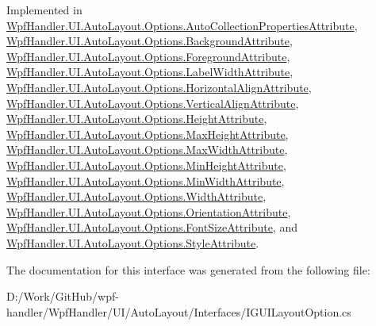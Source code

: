 Implemented in \mbox{\hyperlink{class_wpf_handler_1_1_u_i_1_1_auto_layout_1_1_options_1_1_auto_collection_properties_attribute_aaff2195c793c7e75ac553291d9189655}{Wpf\+Handler.\+U\+I.\+Auto\+Layout.\+Options.\+Auto\+Collection\+Properties\+Attribute}}, \mbox{\hyperlink{class_wpf_handler_1_1_u_i_1_1_auto_layout_1_1_options_1_1_background_attribute_a97cce29c9e19d9145e881c69e3bf3d4e}{Wpf\+Handler.\+U\+I.\+Auto\+Layout.\+Options.\+Background\+Attribute}}, \mbox{\hyperlink{class_wpf_handler_1_1_u_i_1_1_auto_layout_1_1_options_1_1_foreground_attribute_a5231ed2afb4d2d26eac9eab670adca45}{Wpf\+Handler.\+U\+I.\+Auto\+Layout.\+Options.\+Foreground\+Attribute}}, \mbox{\hyperlink{class_wpf_handler_1_1_u_i_1_1_auto_layout_1_1_options_1_1_label_width_attribute_ab8dae5f847875d310747599429c5054a}{Wpf\+Handler.\+U\+I.\+Auto\+Layout.\+Options.\+Label\+Width\+Attribute}}, \mbox{\hyperlink{class_wpf_handler_1_1_u_i_1_1_auto_layout_1_1_options_1_1_horizontal_align_attribute_a53335e3d47b8509f6ce67ad93044a760}{Wpf\+Handler.\+U\+I.\+Auto\+Layout.\+Options.\+Horizontal\+Align\+Attribute}}, \mbox{\hyperlink{class_wpf_handler_1_1_u_i_1_1_auto_layout_1_1_options_1_1_vertical_align_attribute_a5a37e0bcf32b49da94e4f4d539fe810c}{Wpf\+Handler.\+U\+I.\+Auto\+Layout.\+Options.\+Vertical\+Align\+Attribute}}, \mbox{\hyperlink{class_wpf_handler_1_1_u_i_1_1_auto_layout_1_1_options_1_1_height_attribute_a221d69c339ceb5cd3e16d8e59f216cc9}{Wpf\+Handler.\+U\+I.\+Auto\+Layout.\+Options.\+Height\+Attribute}}, \mbox{\hyperlink{class_wpf_handler_1_1_u_i_1_1_auto_layout_1_1_options_1_1_max_height_attribute_a1b1d850c2c5d8e59454d7f9b5271ee88}{Wpf\+Handler.\+U\+I.\+Auto\+Layout.\+Options.\+Max\+Height\+Attribute}}, \mbox{\hyperlink{class_wpf_handler_1_1_u_i_1_1_auto_layout_1_1_options_1_1_max_width_attribute_ab7c7bf52114b1aa465f70debaeccf5f4}{Wpf\+Handler.\+U\+I.\+Auto\+Layout.\+Options.\+Max\+Width\+Attribute}}, \mbox{\hyperlink{class_wpf_handler_1_1_u_i_1_1_auto_layout_1_1_options_1_1_min_height_attribute_a8c049220211484fea64fbd1589a4cc57}{Wpf\+Handler.\+U\+I.\+Auto\+Layout.\+Options.\+Min\+Height\+Attribute}}, \mbox{\hyperlink{class_wpf_handler_1_1_u_i_1_1_auto_layout_1_1_options_1_1_min_width_attribute_a22bf72913c8d5d9f958d1edb1b52beda}{Wpf\+Handler.\+U\+I.\+Auto\+Layout.\+Options.\+Min\+Width\+Attribute}}, \mbox{\hyperlink{class_wpf_handler_1_1_u_i_1_1_auto_layout_1_1_options_1_1_width_attribute_afdff5891e40ae82fc6282d78753ff644}{Wpf\+Handler.\+U\+I.\+Auto\+Layout.\+Options.\+Width\+Attribute}}, \mbox{\hyperlink{class_wpf_handler_1_1_u_i_1_1_auto_layout_1_1_options_1_1_orientation_attribute_affc825395d69d510dfc17e37d330dfc8}{Wpf\+Handler.\+U\+I.\+Auto\+Layout.\+Options.\+Orientation\+Attribute}}, \mbox{\hyperlink{class_wpf_handler_1_1_u_i_1_1_auto_layout_1_1_options_1_1_font_size_attribute_abd93e70e5419e81c4dfdd9b5d1f35343}{Wpf\+Handler.\+U\+I.\+Auto\+Layout.\+Options.\+Font\+Size\+Attribute}}, and \mbox{\hyperlink{class_wpf_handler_1_1_u_i_1_1_auto_layout_1_1_options_1_1_style_attribute_a4507ba7b9729b527b0c4f57bffaac0be}{Wpf\+Handler.\+U\+I.\+Auto\+Layout.\+Options.\+Style\+Attribute}}.



The documentation for this interface was generated from the following file\+:\begin{DoxyCompactItemize}
\item 
D\+:/\+Work/\+Git\+Hub/wpf-\/handler/\+Wpf\+Handler/\+U\+I/\+Auto\+Layout/\+Interfaces/I\+G\+U\+I\+Layout\+Option.\+cs\end{DoxyCompactItemize}
